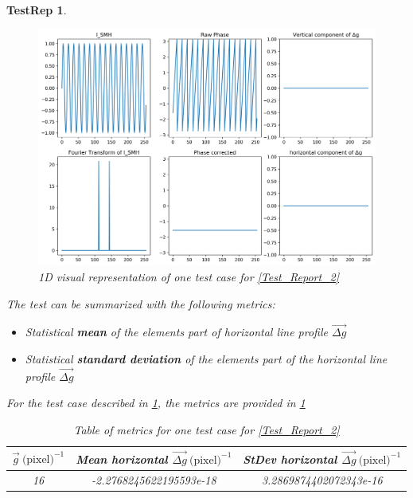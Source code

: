 \documentclass[12pt, titlepage]{article}
\newtheorem{TestRep}{TestRep}
\begin{document}
\begin{TestRep}
\begin{figure}[H]
\begin{center}
\includegraphics[scale=0.5]{Figures/Test_2_explanation_1D.png}
\caption{1D visual representation of one test case for \cref{Test_Report_2}}
\label{fig:Test_2_explaination_1D}
\end{center}
\end{figure}

The test can be summarized with the following metrics:
\begin{itemize}
\item Statistical \textbf{mean} of the elements part of horizontal line profile 
$\overrightarrow{\Delta g}$
\item Statistical \textbf{standard deviation} of the elements part of the 
horizontal line profile $\overrightarrow{\Delta g}$
\end{itemize}

For the test case described in \cref{fig:Test_2_explaination_1D}, the metrics 
are provided in \cref{tb:Metric_test_2_single_case}

\begin{table}[H]
\centering
\begin{tabular}{|c|c|c|}
\hline
$\overrightarrow{g} \ \text{(pixel)}^{-1}$ & Mean horizontal 
$\overrightarrow{\Delta g} \ \text{(pixel)}^{-1}$ & StDev horizontal 
$\overrightarrow{\Delta g} \ \text{(pixel)}^{-1}$ \\
\hline
16			& -2.2768245622195593e-18 & 3.2869874402072343e-16 \\ \hline
\end{tabular}
\caption{Table of metrics for one test case for 
\cref{Test_Report_2}}\label{tb:Metric_test_2_single_case}
\end{table}


\end{TestRep}
\end{document}
